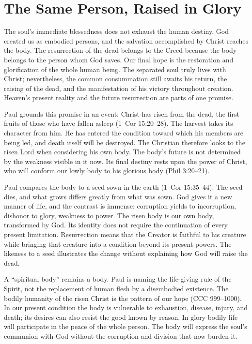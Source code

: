 \section{The Same Person, Raised in Glory}

The soul's immediate blessedness does not exhaust the human destiny. God created us as embodied persons, and the salvation accomplished by Christ reaches the body. The resurrection of the dead belongs to the Creed because the body belongs to the person whom God saves. Our final hope is the restoration and glorification of the whole human being. The separated soul truly lives with Christ; nevertheless, the common consummation still awaits his return, the raising of the dead, and the manifestation of his victory throughout creation. Heaven's present reality and the future resurrection are parts of one promise.

Paul grounds this promise in an event: Christ has risen from the dead, the first fruits of those who have fallen asleep (1~Cor 15:20--28). The harvest takes its character from him. He has entered the condition toward which his members are being led, and death itself will be destroyed. The Christian therefore looks to the risen Lord when considering his own body. The body's future is not determined by the weakness visible in it now. Its final destiny rests upon the power of Christ, who will conform our lowly body to his glorious body (Phil 3:20--21).

Paul compares the body to a seed sown in the earth (1~Cor 15:35--44). The seed dies, and what grows differs greatly from what was sown. God gives it a new manner of life, and the contrast is immense: corruption yields to incorruption, dishonor to glory, weakness to power. The risen body is our own body, transformed by God. Its identity does not require the continuation of every present limitation. Resurrection means that the Creator is faithful to his creature while bringing that creature into a condition beyond its present powers. The likeness to a seed illustrates the change without explaining how God will raise the dead.

A ``spiritual body'' remains a body. Paul is naming the life-giving rule of the Spirit, not the replacement of human flesh by a disembodied existence. The bodily humanity of the risen Christ is the pattern of our hope (CCC 999--1000). In our present condition the body is vulnerable to exhaustion, disease, injury, and death; its desires can also resist the good known by reason. In glory bodily life will participate in the peace of the whole person. The body will express the soul's communion with God without the corruption and division that now burden it.

